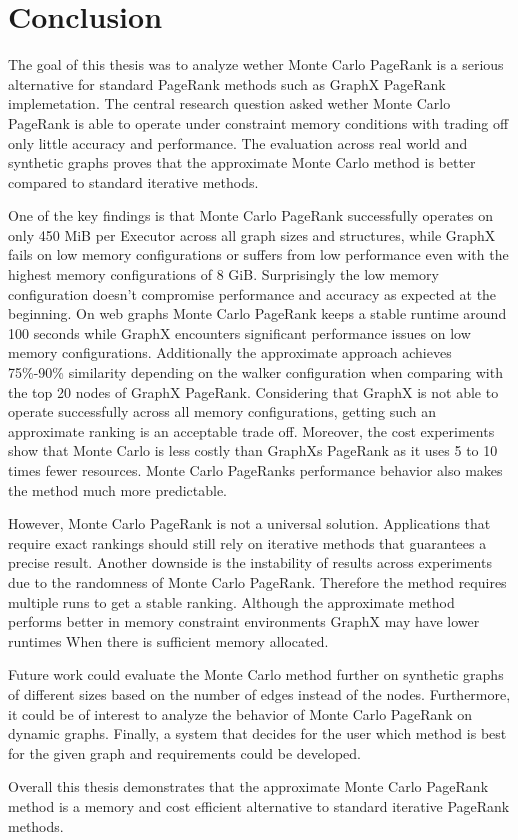 \section{Conclusion}

The goal of this thesis was to analyze wether Monte Carlo PageRank is a serious alternative for standard PageRank methods such as GraphX PageRank implemetation. The central research question asked wether Monte Carlo PageRank is able to operate under constraint memory conditions with trading off only little accuracy and performance. The evaluation across real world and synthetic graphs proves that the approximate Monte Carlo method is better compared to standard iterative methods.\par

One of the key findings is that Monte Carlo PageRank successfully operates on only 450 MiB per Executor across all graph sizes and structures, while GraphX fails on low memory configurations or suffers from low performance even with the highest memory configurations of 8 GiB. Surprisingly the low memory configuration doesn't compromise performance and accuracy as expected at the beginning. On web graphs Monte Carlo PageRank keeps a stable runtime around 100 seconds while GraphX encounters significant performance issues on low memory configurations. Additionally the approximate approach achieves 75\%-90\% similarity depending on the walker configuration when comparing with the top 20 nodes of GraphX PageRank. Considering that GraphX is not able to operate successfully across all memory configurations, getting such an approximate ranking is an acceptable trade off. Moreover, the cost experiments show that Monte Carlo is less costly than GraphXs PageRank as it uses 5 to 10 times fewer resources. Monte Carlo PageRanks performance behavior also makes the method much more predictable.\par

However, Monte Carlo PageRank is not a universal solution. Applications that require exact rankings should still rely on iterative methods that guarantees a precise result. Another downside is the instability of results across experiments due to the randomness of Monte Carlo PageRank. Therefore the method requires multiple runs to get a stable ranking. Although the approximate method performs better in memory constraint environments GraphX may have lower runtimes When there is sufficient memory allocated.\par

Future work could evaluate the Monte Carlo method further on synthetic graphs of different sizes based on the number of edges instead of the nodes. Furthermore, it could be of interest to analyze the behavior of Monte Carlo PageRank on dynamic graphs. Finally, a system that decides for the user which method is best for the given graph and requirements could be developed. \par

Overall this thesis demonstrates that the approximate Monte Carlo PageRank method is a memory and cost efficient alternative to standard iterative PageRank methods. 
